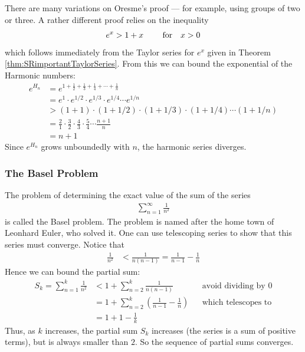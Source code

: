 There are many variations on Oresme's proof --- for example, using groups of two or three. A rather different proof relies on the inequality
\begin{align*}
  e^x > 1 + x \qquad \text{ for\quad $x > 0$}
\end{align*}
which follows immediately from the Taylor series for $e^x$ given
in Theorem \ref{thm:SRimportantTaylorSeries}. From this we can
bound the exponential of the Harmonic numbers:
\begin{align*}
  e^{H_n}
  &= e^{1 + \frac{1}{2} + \frac{1}{3} + \frac{1}{4} + \cdots + \frac{1}{n}}
\\
  &= e^1 \cdot e^{1/2} \cdot e^{1/3} \cdot e^{1/4} \cdots e^{1/n}
  \\
  &> (1+1)\cdot(1+1/2)\cdot(1+1/3)\cdot(1+1/4)\cdots(1+1/n)\\
  &= \frac{2}{1} \cdot \frac{3}{2} \cdot \frac{4}{3} \cdot \frac{5}{4} \cdots \frac{n+1}{n}\\
  &= n+1
\end{align*}
Since $e^{H_n}$ grows unboundedly with $n$, the harmonic series diverges.

\subsubsection*{The Basel Problem}
The problem of determining the exact value of the sum of the series
\begin{align*}
  \sum_{n=1}^\infty \frac{1}{n^2}
\end{align*}
is called the Basel problem.
The problem is named after the home town of Leonhard Euler, who solved it.
One can use telescoping series to show that this series must converge.
Notice that
\begin{align*}
  \frac{1}{n^2} &< \frac{1}{n(n-1)} = \frac{1}{n-1} - \frac{1}{n}
\end{align*}
Hence we can bound the partial sum:
\begin{align*}
  S_k=\sum_{n=1}^k \frac{1}{n^2}
  & < 1 + \sum_{n=2}^k \frac{1}{n(n-1)} && \text{avoid dividing by $0$}\\
  &= 1 + \sum_{n=2}^k \left(\frac{1}{n-1} - \frac{1}{n} \right) &&
                   \text{which telescopes to}\\
  &= 1 + 1 - \frac{1}{k}
\end{align*}
Thus, as $k$ increases, the partial sum $S_k$ increases
(the series is a sum of positive terms), but is always smaller
than $2$.  So the sequence of partial sums converges.

